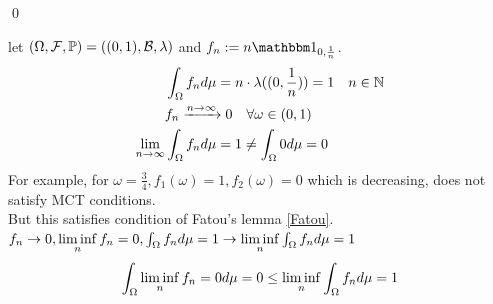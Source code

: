 \qed
\newpage
\begin{example}
let $(\Omega, \mathcal{F}, \mathbb{P}) = ((0,1), \mathcal{B}, \lambda)$ and $f_n:= n\I_{0,\frac{1}{n}}$.
\begin{align*}
    &\int_\Omega f_n d\mu = n \cdot \lambda((0,\frac{1}{n})) = 1 \quad n\in \mathbb{N}\\
    &f_n \xrightarrow{n\rightarrow \infty} 0\quad \forall \omega \in (0,1) \\
    \lim\limits_{n\rightarrow \infty}& \int_\Omega f_n d\mu = 1 \neq \int_\Omega 0 d\mu =0
\end{align*}For example, for $\omega = \frac{3}{4}, f_1(\omega)=1, f_2(\omega)=0$ which is decreasing, does not satisfy MCT conditions.\\[0.5cm]
But this satisfies condition of Fatou's lemma \ref{Fatou}. \\
$f_n \rightarrow 0, \liminf\limits_{n}f_n =0, \int_{\Omega} f_n d\mu = 1 \rightarrow \liminf\limits_{n}\int_{\Omega} f_n d\mu = 1$
\begin{equation*}
    \int_{\Omega} \liminf\limits_{n}f_n =0 d\mu =0 \leq \liminf\limits_{n}\int_{\Omega} f_n d\mu =1
\end{equation*}
\end{example}

